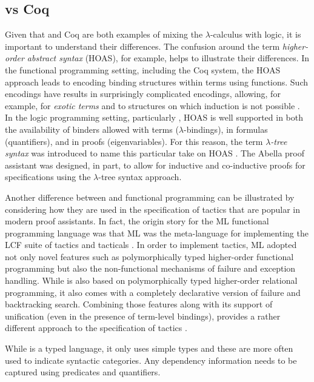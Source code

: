 \subsection{\lP vs Coq}

Given that \lP and Coq are both examples of mixing the
$\lambda$-calculus with logic, it is important to understand their
differences.  The confusion around the term \emph{higher-order
abstract syntax} (HOAS), for example, helps to illustrate their
differences.  In the functional programming setting, including the Coq
system, the HOAS approach leads to encoding binding structures within
terms using functions.  Such encodings have results in surprisingly
complicated encodings, allowing, for example, for \emph{exotic terms}
\cite{despeyroux95tlca} and to structures on which induction is not
possible \cite{roeckl01fossacs}.  In the logic programming setting,
particularly \lP, HOAS is well supported in both the availability of
binders allowed with terms ($\lambda$-bindings), in formulas
(quantifiers), and in proofs (eigenvariables).  For this reason, the
term \emph{$\lambda$-tree syntax} was introduced to name this
particular take on HOAS \cite{miller19jar}.  The Abella proof
assistant \cite{baelde14jfr} was designed, in part, to allow for
inductive and co-inductive proofs for specifications using the
$\lambda$-tree syntax approach.

Another difference between \lP and functional programming can be
illustrated by considering how they are used in the specification of
tactics that are popular in modern proof assistants.  In fact, the
origin story for the ML functional programming language was that ML
was the meta-language for implementing the LCF suite of tactics and
tacticals \cite{gordon79}.  In order to implement tactics, ML adopted
not only novel features such as polymorphically typed higher-order
functional programming but also the non-functional mechanisms of
failure and exception handling.  While \lP is also based on
polymorphically typed higher-order relational programming, it also
comes with a completely declarative version of failure and
backtracking search.  Combining those features along with its support
of unification (even in the presence of term-level bindings), \lP
provides a rather different approach to the specification of tactics
\cite{felty93jar}.

While \lP is a typed language, it only uses simple types and these are
more often used to indicate syntactic categories.  Any dependency
information needs to be captured using predicates and quantifiers. 
